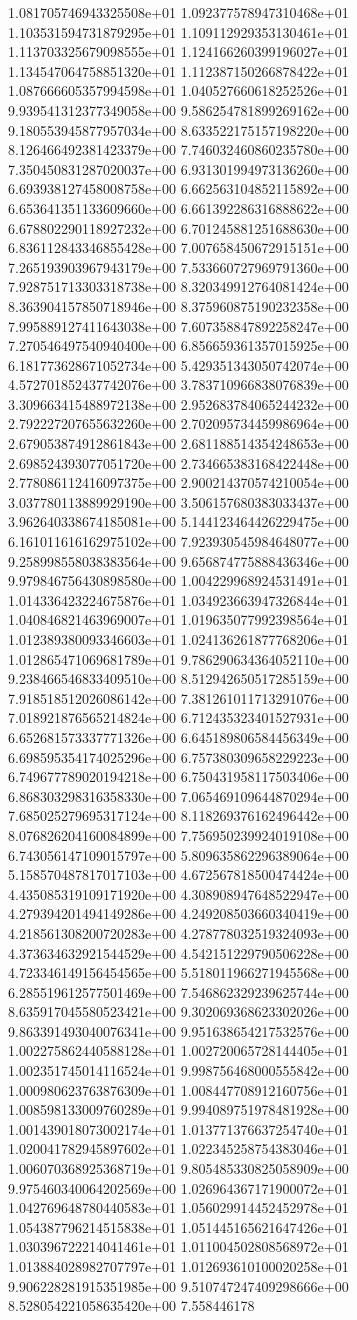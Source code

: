 1.081705746943325508e+01	1.092377578947310468e+01	1.103531594731879295e+01	1.109112929353130461e+01	1.113703325679098555e+01	1.124166260399196027e+01	1.134547064758851320e+01	1.112387150266878422e+01	1.087666605357994598e+01	1.040527660618252526e+01	9.939541312377349058e+00	9.586254781899269162e+00	9.180553945877957034e+00	8.633522175157198220e+00	8.126466492381423379e+00	7.746032460860235780e+00	7.350450831287020037e+00	6.931301994973136260e+00	6.693938127458008758e+00	6.662563104852115892e+00	6.653641351133609660e+00	6.661392286316888622e+00	6.678802290118927232e+00	6.701245881251688630e+00	6.836112843346855428e+00	7.007658450672915151e+00	7.265193903967943179e+00	7.533660727969791360e+00	7.928751713303318738e+00	8.320349912764081424e+00	8.363904157850718946e+00	8.375960875190232358e+00	7.995889127411643038e+00	7.607358847892258247e+00	7.270546497540940400e+00	6.856659361357015925e+00	6.181773628671052734e+00	5.429351343050742074e+00	4.572701852437742076e+00	3.783710966838076839e+00	3.309663415488972138e+00	2.952683784065244232e+00	2.792227207655632260e+00	2.702095734459986964e+00	2.679053874912861843e+00	2.681188514354248653e+00	2.698524393077051720e+00	2.734665383168422448e+00	2.778086112416097375e+00	2.900214370574210054e+00	3.037780113889929190e+00	3.506157680383033437e+00	3.962640338674185081e+00	5.144123464426229475e+00	6.161011616162975102e+00	7.923930545984648077e+00	9.258998558038383564e+00	9.656874775888436346e+00	9.979846756430898580e+00	1.004229968924531491e+01	1.014336423224675876e+01	1.034923663947326844e+01	1.040846821463969007e+01	1.019635077992398564e+01	1.012389380093346603e+01	1.024136261877768206e+01	1.012865471069681789e+01	9.786290634364052110e+00	9.238466546833409510e+00	8.512942650517285159e+00	7.918518512026086142e+00	7.381261011713291076e+00	7.018921876565214824e+00	6.712435323401527931e+00	6.652681573337771326e+00	6.645189806584456349e+00	6.698595354174025296e+00	6.757380309658229223e+00	6.749677789020194218e+00	6.750431958117503406e+00	6.868303298316358330e+00	7.065469109644870294e+00	7.685025279695317124e+00	8.118269376162496442e+00	8.076826204160084899e+00	7.756950239924019108e+00	6.743056147109015797e+00	5.809635862296389064e+00	5.158570487817017103e+00	4.672567818500474424e+00	4.435085319109171920e+00	4.308908947648522947e+00	4.279394201494149286e+00	4.249208503660340419e+00	4.218561308200720283e+00	4.278778032519324093e+00	4.373634632921544529e+00	4.542151229790506228e+00	4.723346149156454565e+00	5.518011966271945568e+00	6.285519612577501469e+00	7.546862329239625744e+00	8.635917045580523421e+00	9.302069368623302026e+00	9.863391493040076341e+00	9.951638654217532576e+00	1.002275862440588128e+01	1.002720065728144405e+01	1.002351745014116524e+01	9.998756468000555842e+00	1.000980623763876309e+01	1.008447708912160756e+01	1.008598133009760289e+01	9.994089751978481928e+00	1.001439018073002174e+01	1.013771376637254740e+01	1.020041782945897602e+01	1.022345258754383046e+01	1.006070368925368719e+01	9.805485330825058909e+00	9.975460340064202569e+00	1.026964367171900072e+01	1.042769648780440583e+01	1.056029914452452978e+01	1.054387796214515838e+01	1.051445165621647426e+01	1.030396722214041461e+01	1.011004502808568972e+01	1.013884028982707797e+01	1.012693610100020258e+01	9.906228281915351985e+00	9.510747247409298666e+00	8.528054221058635420e+00	7.558446178